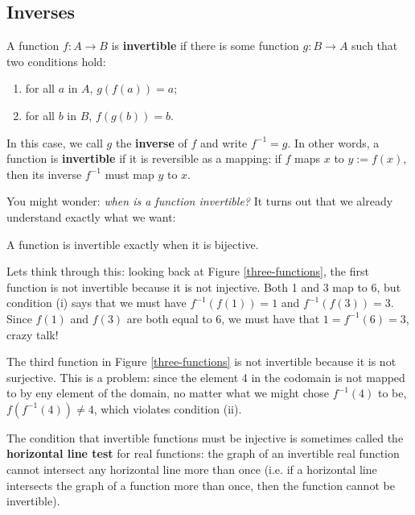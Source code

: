 \subsection{Inverses}
A function $f:A\to B$ is \textbf{invertible} if there is some function $g:B\to A$ such that two conditions hold:
\begin{enumerate}
\item[(i)] for all $a$ in $A$, $g(f(a))=a$;
\item[(ii)] for all $b$ in $B$, $f(g(b))=b$.
\end{enumerate}
In this case, we call $g$ the \textbf{inverse} of $f$ and write $f^{-1}=g$. In other words, a function is \textbf{invertible} if it is reversible as a mapping: if $f$ maps $x$ to $y:=f(x)$, then its inverse $f^{-1}$ must map $y$ to $x$. 

You might wonder: \textit{when is a function invertible?} It turns out that we already understand exactly what we want:
\begin{thm}
A function is invertible exactly when it is bijective.
\end{thm}
\begin{exampleblock}
Lets think through this: looking back at Figure \ref{three-functions}, the first function is not invertible because it is not injective. Both 1 and 3 map to 6, but condition (i) says that we must have $f^{-1}(f(1))=1$ and $f^{-1}(f(3))=3$. Since $f(1)$ and $f(3)$ are both equal to $6$, we must have that $1=f^{-1}(6)=3$, crazy talk!
\end{exampleblock}

\begin{exampleblock}
The third function in Figure \ref{three-functions} is not invertible because it is not surjective. This is a problem: since the element 4 in the codomain is not mapped to by eny element of the domain, no matter what we might chose $f^{-1}(4)$ to be, $f(f^{-1}(4))\neq 4$, which violates condition (ii).
\end{exampleblock}

The condition that invertible functions must be injective is sometimes called the \textbf{horizontal line test} for real functions: the graph of an invertible real function cannot intersect any horizontal line more than once (i.e. if a horizontal line intersects the graph of a function more than once, then the function cannot be invertible). 

